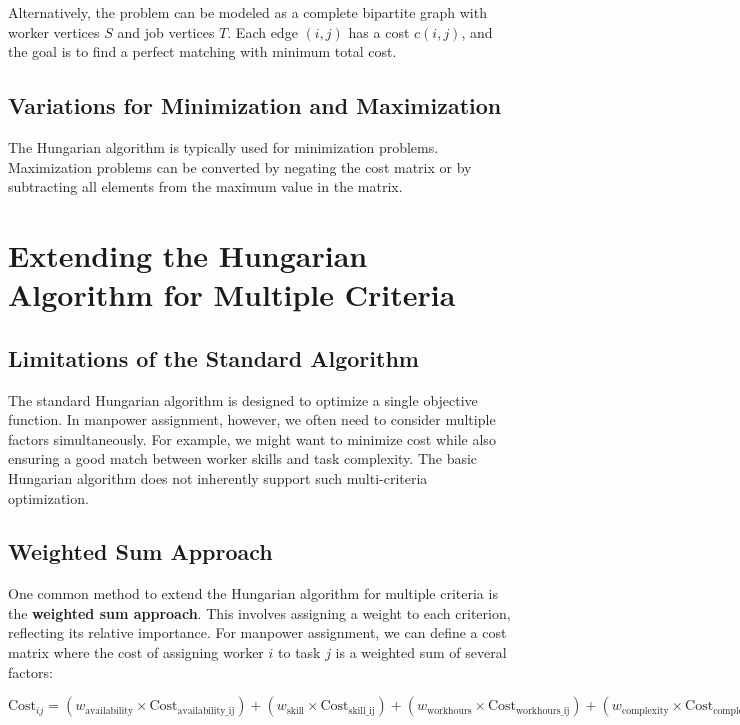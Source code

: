 \documentclass{article}
\begin{document}
Alternatively, the problem can be modeled as a complete bipartite graph with worker vertices $S$ and job vertices $T$. Each edge $(i, j)$ has a cost $c(i, j)$, and the goal is to find a perfect matching with minimum total cost.

\subsection{Variations for Minimization and Maximization}

The Hungarian algorithm is typically used for minimization problems. Maximization problems can be converted by negating the cost matrix or by subtracting all elements from the maximum value in the matrix.

\section{Extending the Hungarian Algorithm for Multiple Criteria}

\subsection{Limitations of the Standard Algorithm}

The standard Hungarian algorithm is designed to optimize a single objective function. In manpower assignment, however, we often need to consider multiple factors simultaneously. For example, we might want to minimize cost while also ensuring a good match between worker skills and task complexity. The basic Hungarian algorithm does not inherently support such multi-criteria optimization.

\subsection{Weighted Sum Approach}

One common method to extend the Hungarian algorithm for multiple criteria is the \textbf{weighted sum approach}. This involves assigning a weight to each criterion, reflecting its relative importance. For manpower assignment, we can define a cost matrix where the cost of assigning worker $i$ to task $j$ is a weighted sum of several factors:

\begin{equation}
\text{Cost}_{ij} = (w_{\text{availability}} \times \text{Cost}_{\text{availability\_ij}}) + (w_{\text{skill}} \times \text{Cost}_{\text{skill\_ij}}) + (w_{\text{workhours}} \times \text{Cost}_{\text{workhours\_ij}}) + (w_{\text{complexity}} \times \text{Cost}_{\text{complexity\_ij}})
\end{equation}
\end{document}
